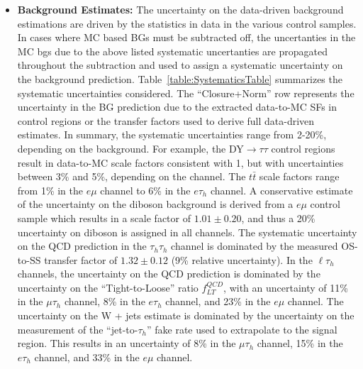 \begin{itemize}
  \item \textbf{Background Estimates:} The uncertainty on the data-driven background estimations are driven by the statistics in data in the various control
samples. 
In cases where MC based BGs must be subtracted off, the uncertanties in the MC bgs due to the above listed
systematic uncertanties are propagated throughout the subtraction and used to assign a systematic uncertainty on the background prediction. 
Table~\ref{table:SystematicsTable} summarizes the systematic uncertainties considered. The ``Closure+Norm'' row represents the uncertainty in 
the BG prediction due to the extracted data-to-MC SFs in control regions or the transfer factors used to derive full data-driven estimates. 
In summary, the systematic uncertainties range from 2-20\%, depending on the background. For example, the DY$\to\tau\tau$ control regions 
result in data-to-MC scale factors consistent with 1, but with uncertainties between 3\% and 5\%, depending on the channel. The $t\bar{t}$ scale 
factors range from 1\% in the $e\mu$ channel to 6\% in the $e\tau_{h}$ channel. A conservative estimate of the uncertainty on the diboson background 
is derived from a $e\mu$ control sample which results in a scale factor of $1.01 \pm 0.20$, and thus a 20\% uncertainty on diboson is assigned in all 
channels. The systematic uncertainty on the QCD prediction in the $\tau_{h}\tau_{h}$ channel is dominated by the measured OS-to-SS transfer factor 
of $1.32 \pm 0.12$ (9\% relative uncertainty). In the $\ell\tau_{h}$ channels, the uncertainty on the QCD prediction is dominated by the uncertainty 
on the ``Tight-to-Loose'' ratio $f_{LT}^{QCD}$, with an uncertainty of 
11\% in the $\mu\tau_{h}$ channel, 8\% in the $e\tau_{h}$ channel, and 
23\% in the $e\mu$ channel. The uncertainty on the W + jets estimate is dominated by the uncertainty on the measurement of the ``jet-to-$\tau_{h}$'' fake 
rate used to extrapolate to the signal region. This results in an 
uncertainty of 8\% in the $\mu\tau_{h}$ channel, 15\% in the $e\tau_{h}$ 
channel, and 33\% in the $e\mu$ channel. 

\end{itemize}

\newcommand{\ch}{\tiny $hh$, $\mu h$, $eh$, $e\mu$}
\newcommand{\chs}{\footnotesize \thth, \tmth, \teth, \tetm}

